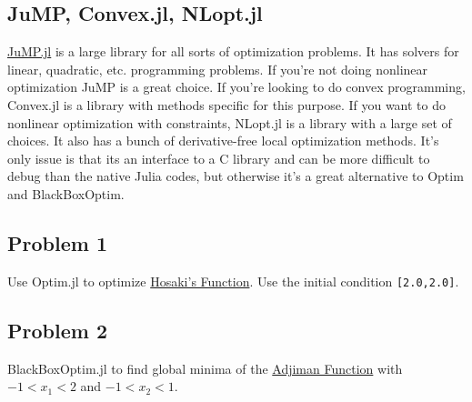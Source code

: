 \documentclass[11pt]{article}
\begin{document}
    \subsection{JuMP, Convex.jl, NLopt.jl}\label{jump-convex.jl-nlopt.jl}

\href{https://jump.readthedocs.io/en/latest/quickstart.html}{JuMP.jl} is
a large library for all sorts of optimization problems. It has solvers
for linear, quadratic, etc. programming problems. If you're not doing
nonlinear optimization JuMP is a great choice. If you're looking to do
convex programming, Convex.jl is a library with methods specific for
this purpose. If you want to do nonlinear optimization with constraints,
NLopt.jl is a library with a large set of choices. It also has a bunch
of derivative-free local optimization methods. It's only issue is that
its an interface to a C library and can be more difficult to debug than
the native Julia codes, but otherwise it's a great alternative to Optim
and BlackBoxOptim.

    \subsection{Problem 1}\label{problem-1}

Use Optim.jl to optimize
\href{http://al-roomi.org/benchmarks/unconstrained/2-dimensions/58-hosaki-s-function}{Hosaki's
Function}. Use the initial condition \texttt{{[}2.0,2.0{]}}.

\subsection{Problem 2}\label{problem-2}

BlackBoxOptim.jl to find global minima of the
\href{https://arxiv.org/pdf/1308.4008.pdf}{Adjiman Function} with
\(-1 < x_1 < 2\) and \(-1 < x_2 < 1\).


    
    
    
    
\end{document}
